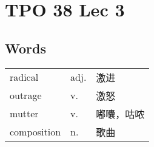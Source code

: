 \section{TPO 38 Lec 3}

\subsection{Words}

\begin{tabular}{lll}
    radical     & adj. & 激进    \\
    outrage     & v.   & 激怒    \\
    mutter      & v.   & 嘟囔，咕哝 \\
    composition & n.   & 歌曲    \\
\end{tabular}
